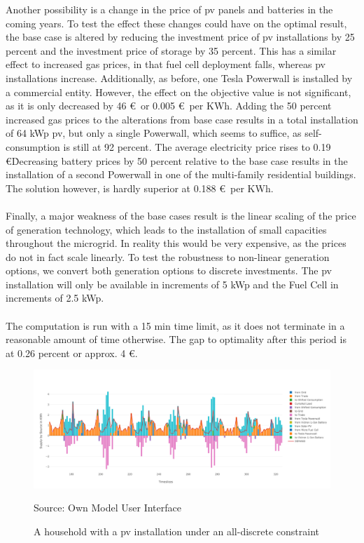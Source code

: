 \documentclass[
	11pt,								%
	DIV10,								%
	a4paper,         					%
	oneside,							%
	headheight=20pt,					%
	footheight=20pt,					%
    parskip=full,						%
    listof=totoc,						%
	bibliography=totoc,					%
	index=totoc,						%
]{scrartcl}
\begin{document}
Another possibility is a change in the price of pv panels and batteries in the coming years. To test the effect these changes could have on the optimal result, the base case is altered by reducing the investment price of pv installations by 25 percent and the investment price of storage by 35 percent. This has a similar effect to increased gas prices, in that fuel cell deployment falls, whereas pv installations increase. Additionally, as before, one Tesla Powerwall is installed by a commercial entity. However, the effect on the objective value is not significant, as it is only decreased by 46 \euro\ or 0.005 \euro\ per KWh. Adding the 50 percent increased gas prices to the alterations from base case results in a total installation of 64 kWp pv, but only a single Powerwall, which seems to suffice, as self-consumption is still at 92 percent. The average electricity price rises to 0.19 \euro\. Decreasing battery prices by 50 percent relative to the base case results in the installation of a second Powerwall in one of the multi-family residential buildings. The solution however, is hardly superior at 0.188 \euro\ per KWh. 
\\\\
Finally, a major weakness of the base cases result is the linear scaling of the price of generation technology, which leads to the installation of small capacities throughout the microgrid. In reality this would be very expensive, as the prices do not in fact scale linearly. To test the robustness to non-linear generation options, we convert both generation options to discrete investments. The pv installation will only be available in increments of 5 kWp and the Fuel Cell in increments of 2.5 kWp.\\\\ 
	The computation is run with a 15 min time limit, as it does not terminate in a reasonable amount of time otherwise. The gap to optimality after this period is at 0.26 percent or approx. 4 \euro. 

\begin{figure}[H]
	\centering
	\includegraphics[width=1\textwidth]{pictures/RES_2_DISC.png}
	\caption{A household with a pv installation under an all-discrete constraint}
	\label{commercial_dispatch_base}
	\flushleft\quad\quad\footnotesize{Source: Own Model User Interface}
\end{figure}	
\end{document}
